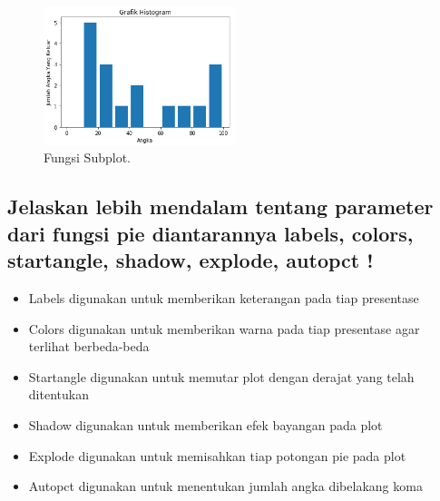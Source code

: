 		\begin{figure}[!htbp!]
			\centerline{\includegraphics[width=0.5\textwidth]{figures/6/Teori/1164081/1164081_3.png}}
			\caption{Fungsi Subplot.}
			\label{10}
		\end{figure}
\subsection{Jelaskan lebih mendalam tentang parameter dari fungsi pie diantarannya labels, colors, startangle, shadow, explode, autopct !}
	\begin{itemize}
		\item Labels digunakan untuk memberikan keterangan pada tiap presentase
		\item Colors digunakan untuk memberikan warna pada tiap presentase agar terlihat berbeda-beda
		\item Startangle digunakan untuk memutar plot dengan derajat yang telah ditentukan
		\item Shadow digunakan untuk memberikan efek bayangan pada plot
		\item Explode digunakan untuk memisahkan tiap potongan pie pada plot
		\item Autopct digunakan untuk menentukan jumlah angka dibelakang koma
	\end{itemize}

